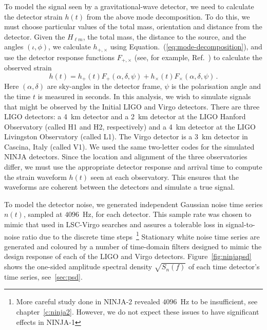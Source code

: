 To model the signal seen by a gravitational-wave detector, we need to
calculate the detector strain $h(t)$ from the above mode
decomposition. To do this, we must choose particular values of the
total mass, orientation and distance from the detector.  Given the
$H_{\ell m}$, the total mass, the distance to the source, and the
angles $(\iota,\phi)$, we calculate $h_{+,\times}$ using
Equation.~(\ref{eq:mode-decomposition}), and use the detector response
functions $F_{+,\times}$ (see, for example, Ref.~\cite{thorne.k:1987})
to calculate the observed strain
\begin{equation}
  h(t) = h_+(t) F_+(\alpha,\delta,\psi) + h_\times(t) F_\times(\alpha,\delta,\psi)\,.
\end{equation} %
%
Here $(\alpha,\delta)$ are sky-angles in the detector frame, $\psi$ is
the polarisation angle and the time $t$ is measured in seconds. In
this analysis, we wish to simulate signals that might be observed by
the Initial LIGO and Virgo detectors. There are three LIGO detectors:
a 4~km detector and a 2~km detector at the LIGO Hanford Observatory
(called H1 and H2, respectively) and a 4~km detector at the LIGO
Livingston Observatory (called L1). The Virgo detector is a 3~km
detector in Cascina, Italy (called V1). We used the same two-letter
codes for the simulated NINJA detectors.  Since the location and
alignment of the three observatories differ, we must use the
appropriate detector response and arrival time to compute the strain
waveform $h(t)$ seen at each observatory. This ensures that the
waveforms are coherent between the detectors and simulate a true
signal.

To model the detector noise, we generated independent Gaussian noise
time series $n(t)$, sampled at $4096$~Hz, for each detector. This
sample rate was chosen to mimic that used in LSC-Virgo searches and
assures a tolerable loss in signal-to-noise ratio due to the discrete
time steps~\footnote{More careful study done in NINJA-2 revealed
$4096$~Hz to be insufficient, see chapter~\ref{c:ninja2}.  However, we
do not expect these issues to have significant effects in NINJA-1}
Stationary white noise time series are generated and coloured by a
number of time-domain filters designed to mimic  the design response
of each of the LIGO and Virgo detectors. Figure~\ref{fig:ninjapsd}
shows the one-sided amplitude spectral density $\sqrt{S_n(f)}$ of each
time detector's time series, see~\ref{sec:psd}.  

